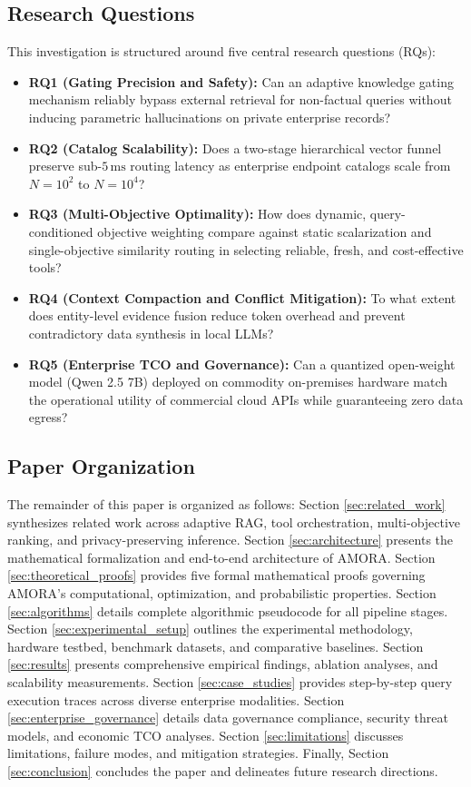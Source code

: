 \subsection{Research Questions}
This investigation is structured around five central research questions (RQs):
\begin{itemize}
    \item \textbf{RQ1 (Gating Precision and Safety):} Can an adaptive knowledge gating mechanism reliably bypass external retrieval for non-factual queries without inducing parametric hallucinations on private enterprise records?
    \item \textbf{RQ2 (Catalog Scalability):} Does a two-stage hierarchical vector funnel preserve sub-$5\,\text{ms}$ routing latency as enterprise endpoint catalogs scale from $N = 10^2$ to $N = 10^4$?
    \item \textbf{RQ3 (Multi-Objective Optimality):} How does dynamic, query-conditioned objective weighting compare against static scalarization and single-objective similarity routing in selecting reliable, fresh, and cost-effective tools?
    \item \textbf{RQ4 (Context Compaction and Conflict Mitigation):} To what extent does entity-level evidence fusion reduce token overhead and prevent contradictory data synthesis in local LLMs?
    \item \textbf{RQ5 (Enterprise TCO and Governance):} Can a quantized open-weight model (Qwen 2.5 7B) deployed on commodity on-premises hardware match the operational utility of commercial cloud APIs while guaranteeing zero data egress?
\end{itemize}

\subsection{Paper Organization}
The remainder of this paper is organized as follows: Section \ref{sec:related_work} synthesizes related work across adaptive RAG, tool orchestration, multi-objective ranking, and privacy-preserving inference. Section \ref{sec:architecture} presents the mathematical formalization and end-to-end architecture of AMORA. Section \ref{sec:theoretical_proofs} provides five formal mathematical proofs governing AMORA's computational, optimization, and probabilistic properties. Section \ref{sec:algorithms} details complete algorithmic pseudocode for all pipeline stages. Section \ref{sec:experimental_setup} outlines the experimental methodology, hardware testbed, benchmark datasets, and comparative baselines. Section \ref{sec:results} presents comprehensive empirical findings, ablation analyses, and scalability measurements. Section \ref{sec:case_studies} provides step-by-step query execution traces across diverse enterprise modalities. Section \ref{sec:enterprise_governance} details data governance compliance, security threat models, and economic TCO analyses. Section \ref{sec:limitations} discusses limitations, failure modes, and mitigation strategies. Finally, Section \ref{sec:conclusion} concludes the paper and delineates future research directions.
